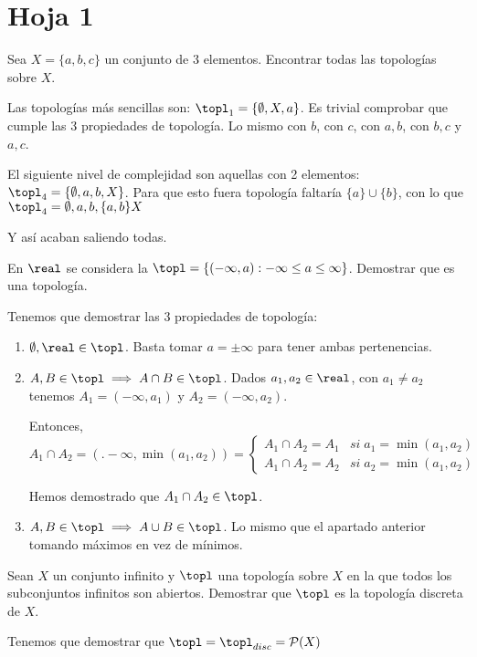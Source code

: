 \section{Hoja 1}

\begin{problem}[1]
Sea $X=\{a,b,c\}$ un conjunto de 3 elementos. Encontrar todas las topologías sobre $X$.
\solution

Las topologías más sencillas son: $\topl_1 = \{\emptyset,X,a\}$. Es trivial comprobar que cumple las 3 propiedades de topología. Lo mismo con $b$, con $c$, con ${a,b}$, con ${b,c}$ y ${a,c}$.

El siguiente nivel de complejidad son aquellas con 2 elementos: $\topl_4 = \{\emptyset,a,b,X\}$. Para que esto fuera topología faltaría $\{a\} \cup \{b\}$, con lo que $\topl_4 = {\emptyset,a,b,\{a,b\}X}$

Y así acaban saliendo todas.
\end{problem}

\begin{problem}[2]
En $\real$ se considera la $\topl =\{(-\infty,a): -\infty \leq a \leq \infty\}$. Demostrar que es una topología.
\solution

Tenemos que demostrar las 3 propiedades de topología:

\begin{enumerate}
\item $\emptyset,\real \in \topl$. Basta tomar $a=\pm \infty$ para tener ambas pertenencias.
\item $A,B\in\topl \implies A\cap B\in\topl$. Dados $a_1,a_2\in\real$, con $a_1\neq a_2$ tenemos $A_1 = (-\infty,a_1)$ y $A_2 = (-\infty,a_2)$.

Entonces, $A_1\cap A_2 = (.-\infty,\min(a_1,a_2)) = \left\{\begin{array}{cc}
A_1\cap A_2 = A_1 & si\; a_1 = \min(a_1,a_2)\\A_1\cap A_2 = A_2  & si\; a_2 = \min(a_1,a_2)
\end{array}\right.$

Hemos demostrado que $A_1 \cap A_2 \in \topl$.

\item $A,B\in\topl \implies A\cup B\in\topl$. Lo mismo que el apartado anterior tomando máximos en vez de mínimos.
\end{enumerate}
\end{problem}


\begin{problem}[3]
Sean $X$ un conjunto infinito y $\topl$ una topología sobre $X$ en la que todos los subconjuntos infinitos son abiertos. Demostrar que $\topl$ es la topología discreta de $X$.
\solution

Tenemos que demostrar que $\topl = \topl_{disc} = \mathcal{P}(X)$
\end{problem}

